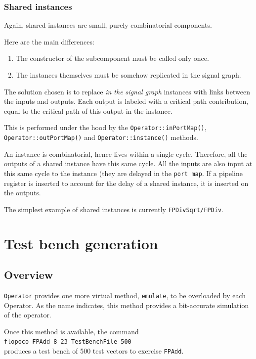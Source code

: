 \documentclass{article}
\begin{document}
\subsubsection{Shared instances}

Again, shared instances are small, purely combinatorial components.

Here are the main differences:
\begin{enumerate}
\item The constructor of the subcomponent must be called only once.
\item The instances themselves must be somehow replicated in the signal graph.
\end{enumerate}
The solution chosen is to replace \emph{in the signal graph} instances with links between the inputs and outputs.
Each output is labeled with a critical path contribution,   equal to the critical path of this output in the instance.

This is performed under the hood by the \verb!Operator::inPortMap()!, \verb!Operator::outPortMap()! and \verb!Operator::instance()! methods.

An instance is combinatorial, hence lives within a single cycle.
Therefore, all the outputs of a shared instance have this same cycle.
All the inputs are also input at this same cycle to the instance (they are delayed in the \texttt{port map}.
If a pipeline register is inserted to account for the delay of a shared instance, it is inserted on the outputs.

The simplest example of shared instances is currently \texttt{FPDivSqrt/FPDiv}.


\section{Test bench generation}\label{sec:test-bench-gener}

\subsection{Overview}
\texttt{\small Operator} provides one more virtual method, \texttt{\small emulate},
to be overloaded by each Operator. As the name indicates, this method
provides a bit-accurate simulation of the operator.
 
Once this method is available, the command\\
 \texttt{flopoco FPAdd 8 23 TestBenchFile 500} \\
produces a test bench of 500 test vectors to exercise \texttt{\small FPAdd}. 
\end{document}

